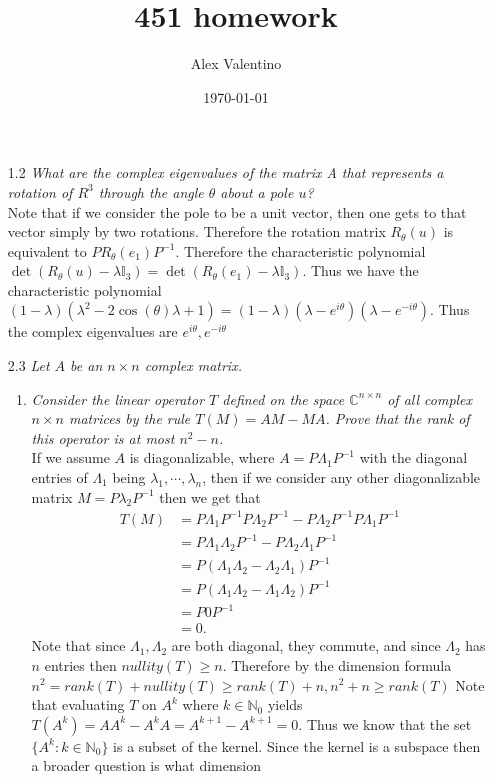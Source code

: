 \documentclass[12pt, letterpaper]{article}
\date{\today}
\author{Alex Valentino}
\title{451 homework}
\newcommand{\N}{\mathbb{N}}
\newcommand{\C}{\mathbb{C}}
\begin{document}
\begin{enumerate}
	\item[1.2] \textit{What are the complex eigenvalues of the matrix A that represents a rotation of $R^3$ through
the angle $\theta$ about a pole $u$?}\\
		Note that if we consider the pole to be a unit vector, then one gets to that vector simply by two rotations.  Therefore the rotation matrix
		$R_\theta(u)$ is equivalent to $P R_\theta(e_1) P^{-1}$.  Therefore
		the characteristic polynomial $\det (R_\theta(u) - \lambda \mathbb{I}_3) = \det ( R_\theta(e_1) - \lambda \mathbb{I}_3)$.
		Thus we have the characteristic polynomial 
		$(1-\lambda)(\lambda^2-2\cos(\theta)\lambda + 1) = 
		(1-\lambda)(\lambda - e^{i \theta})(\lambda - e^{-i \theta})$.
		Thus the complex eigenvalues are $e^{i\theta}, e^{-i\theta}$
	\item[2.3] \textit{Let $A$ be an $n \times n$ complex matrix.}
	\begin{enumerate}
		\item \textit{Consider the linear operator $T$ defined on the space $\C^{n \times n}$ of all complex $n \times n$ matrices
by the rule $T(M) = AM - MA$. Prove that the rank of this operator is at most $n^2 - n$.}\\
	If we assume $A$ is diagonalizable, where $A=P\Lambda_1 P^{-1}$ with the diagonal entries of $\Lambda_1$ being $\lambda_1,\cdots,\lambda_n$, then if we consider any other diagonalizable matrix $M = P\lambda_2 P^{-1}$ then 
	we get that \begin{align*}
	 T(M) &= P\Lambda_1 P^{-1}P\Lambda_2 P^{-1}-P\Lambda_2 P^{-1}P\Lambda_1 P^{-1}\\ 
	 &= P\Lambda_1 \Lambda_2 P^{-1}-P\Lambda_2 \Lambda_1 P^{-1}\\ 
	 &= P(\Lambda_1 \Lambda_2 - \Lambda_2 \Lambda_1 )P^{-1}\\ 
	 &= P(\Lambda_1 \Lambda_2 - \Lambda_1 \Lambda_2 )P^{-1}\\ 
	 &= P0P^{-1}\\ &= 0.
\end{align*}	
	Note that since $\Lambda_1, \Lambda_2$ are both diagonal, they commute, and since $\Lambda_2$ has $n$ entries then $nullity(T)\geq n$. Therefore
	by the dimension formula $n^2 = rank(T) + nullity(T)\geq rank(T) + n, n^2 + n \geq rank(T)$
	\iffalse
	Note that evaluating $T$ on $A^k$ where $k \in \N_0$ yields
	$T(A^k) = AA^k - A^kA = A^{k+1} - A^{k+1} = 0$.  Thus we 
	know that the set $\{A^k : k \in \N_0\} $ is a subset of the kernel.  
	Since the kernel is a subspace then a broader question is what dimension 

\end{enumerate}
\end{enumerate}
\end{document}
